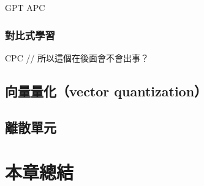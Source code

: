 GPT
APC


\subsubsection{對比式學習}

CPC // 所以這個在後面會不會出事？

\subsection{向量量化（vector quantization）}



\subsection{離散單元}



\section{本章總結}


